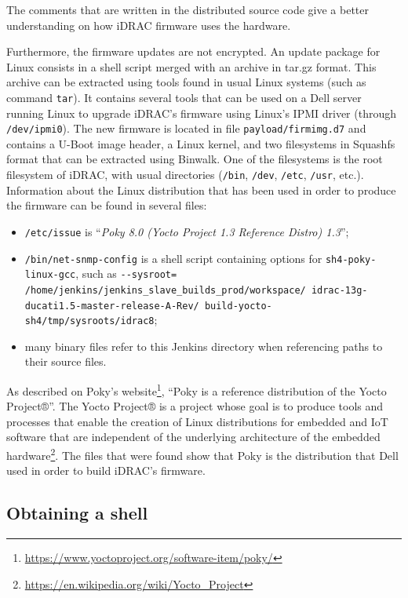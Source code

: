 The comments that are written in the distributed source code give a better understanding on how iDRAC firmware uses the hardware.

Furthermore, the firmware updates are not encrypted.
An update package for Linux consists in a shell script merged with an archive in tar.gz format.
This archive can be extracted using tools found in usual Linux systems (such as command \texttt{tar}).
It contains several tools that can be used on a Dell server running Linux to upgrade iDRAC's firmware using Linux's IPMI driver (through \texttt{/dev/ipmi0}).
The new firmware is located in file \texttt{payload/firmimg.d7} and contains a U-Boot image header, a Linux kernel, and two filesystems in Squashfs format that can be extracted using Binwalk.
One of the filesystems is the root filesystem of iDRAC, with usual directories (\texttt{/bin}, \texttt{/dev}, \texttt{/etc}, \texttt{/usr}, etc.).
Information about the Linux distribution that has been used in order to produce the firmware can be found in several files:
\begin{itemize}
  \item \texttt{/etc/issue} is ``\emph{Poky 8.0 (Yocto Project 1.3 Reference Distro) 1.3}'';
  \item \texttt{/bin/net-snmp-config} is a shell script containing options for \texttt{sh4-poky-linux-gcc}, such as \texttt{-{}-sysroot= /home/jenkins/jenkins\_slave\_builds\_prod/workspace/ idrac-13g-ducati1.5-master-release-A-Rev/ build-yocto-sh4/tmp/sysroots/idrac8};
  \item many binary files refer to this Jenkins directory when referencing paths to their source files.
\end{itemize}

As described on Poky's website\footnote{\url{https://www.yoctoproject.org/software-item/poky/}}, ``Poky is a reference distribution of the Yocto Project®''.
The Yocto Project® is a project whose goal is to produce tools and processes that enable the creation of Linux distributions for embedded and IoT software that are independent of the underlying architecture of the embedded hardware\footnote{\url{https://en.wikipedia.org/wiki/Yocto_Project}}.
The files that were found show that Poky is the distribution that Dell used in order to build iDRAC's firmware.

\subsection{Obtaining a shell}

